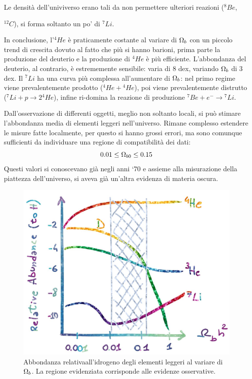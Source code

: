 Le densità dell'univiverso erano tali da non permettere ulteriori reazioni (${^8Be}$, {$^{12}C$), si forma soltanto un po' di $^7{Li}$. 

In conclusione, l'${^4He}$ è praticamente costante al variare di $\Omega_{b}$ con un piccolo trend di crescita dovuto al fatto che più si hanno barioni, prima parte la produzione del deuterio e la produzione di ${^4He}$ è più efficiente. L'abbondanza del deuterio, al contrario, è estrememente sensibile: varia di $8$ dex, variando $\Omega_{b}$ di $3$ dex. Il ${^7Li}$ ha una curva più complessa all'aumentare di $\Omega_{b}$: nel primo regime viene prevalentemente prodotto (${^4He}+{^4He}$), poi viene prevalentemente distrutto (${^7Li}+p\rightarrow 2{^4He}$), infine ri-domina la reazione di produzione ${^7Be+e^- \rightarrow {^7Li}}$.

Dall'osservazione di differenti oggetti, meglio non soltanto locali, si può stimare l'abbondanza media di elementi leggeri nell'universo. Rimane complesso estendere le misure fatte localmente, per questo si hanno grossi errori, ma sono comunque sufficienti da individuare una regione di compatibilità dei dati:
$$
0.01 \le \Omega_{b0} \le 0.15
$$
Questi valori si conoscevano già negli anni `70 e assieme alla misurazione della piattezza dell'universo, si aveva già un'altra evidenza di materia oscura. 

\begin{figure}[ht]
    \centering
    \includegraphics[width=.67\textwidth]{Pictures/5/eleggeriomegab.jpg}
    \caption{Abbondanza relativaall'idrogeno degli elementi leggeri al variare di $\Omega_{b}$. La regione evidenziata corrisponde alle evidenze osservative.}
\end{figure}

}
